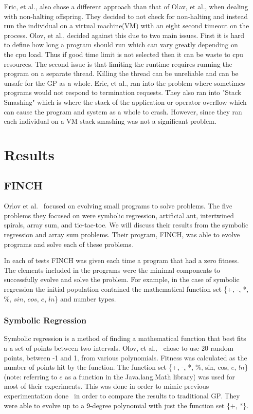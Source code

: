 \documentclass{sig-alternate}
\begin{document}
Eric, et al., also chose a different approach than that of Olav, et al., when dealing with non-halting offspring. They decided to not check for non-halting and instead run the individual on a virtual machine(VM) with an eight second timeout on the process. Olov, et al., decided against this due to two main issues. First it is hard to define how long a program should run which can vary greatly depending on the cpu load. Thus if good time limit is not selected then it can be waste to cpu resources. The second issue is that limiting the runtime requires running the program on a separate thread. Killing the thread can be unreliable and can be unsafe for the GP as a whole. Eric, et al., ran into the problem where sometimes programs would not respond to termination requests.
They also ran into "Stack Smashing" which is where the stack of the application or operator overflow which can cause the program and system as a whole to crash. However, since they ran each individual on a VM stack smashing was not a significant problem.




\section{Results}
\subsection{FINCH}
Orlov et al.~\cite{FINCH:2011} focused on evolving small programs to solve problems. The five problems they focused on were symbolic regression, artificial ant, intertwined spirals, array sum, and tic-tac-toe. We will discuss their results from the symbolic regression and array sum problems. Their program, FINCH, was able to evolve programs and solve each of these problems.

In each of tests FINCH was given each time a program that had a zero fitness. The elements included in the programs were the minimal components to successfully evolve and solve the problem. For example, in the case of symbolic regression the initial population contained the mathematical function set \{+, -, *, \%, $sin$, $cos$, $e$,  $ln$\} and number types.


\subsubsection{Symbolic Regression}
Symbolic regression is a method of finding a mathematical function that best fits a a set of points between two intervals. Olov, et al.,~\cite{FINCH:2011} chose to use 20 random points, between -1 and 1, from various polynomials. Fitness was calculated as the number of points hit by the function. The function set \{+, -, *, \%, sin, cos, $e$, $ln$\}(note: referring to $e$ as a function in the Java.lang.Math library) was used for most of their experiments. This was done in order to mimic previous experimentation done~\cite{koza:1992} in order to compare the results to traditional GP. They were able to evolve up to a 9-degree polynomial with just the function set \{+, *\}.
\end{document}
